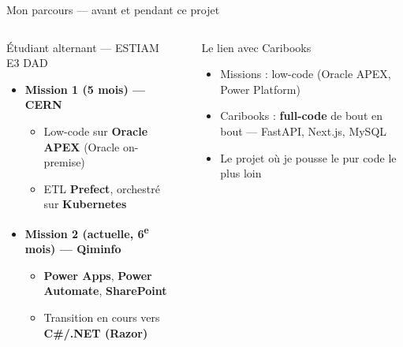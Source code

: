 \documentclass[aspectratio=169,10pt]{beamer}
\begin{document}
\begin{frame}{Mon parcours --- avant et pendant ce projet}
  \begin{columns}[T]
    \begin{block}{Étudiant alternant --- ESTIAM E3 DAD}
      \begin{itemize}\small
        \item \textbf{Mission 1 (5 mois) --- CERN}
        \begin{itemize}\scriptsize
          \item Low-code sur \textbf{Oracle APEX} (Oracle on-premise)
          \item ETL \textbf{Prefect}, orchestré sur \textbf{Kubernetes}
        \end{itemize}
        \item \textbf{Mission 2 (actuelle, 6\textsuperscript{e} mois) --- Qiminfo}
        \begin{itemize}\scriptsize
          \item \textbf{Power Apps}, \textbf{Power Automate}, \textbf{SharePoint}
          \item Transition en cours vers \textbf{C\#/.NET (Razor)}
        \end{itemize}
      \end{itemize}
    \end{block}
    \vspace{6pt}
    \begin{center}
    \end{center}
    \begin{exampleblock}{Le lien avec Caribooks}
      \begin{itemize}\small
        \item Missions : low-code (Oracle APEX, Power Platform)
        \item Caribooks : \textbf{full-code} de bout en bout --- FastAPI, Next.js, MySQL
        \item Le projet où je pousse le \og pur code \fg{} le plus loin
      \end{itemize}
    \end{exampleblock}
  \end{columns}
\end{frame}
\end{document}
